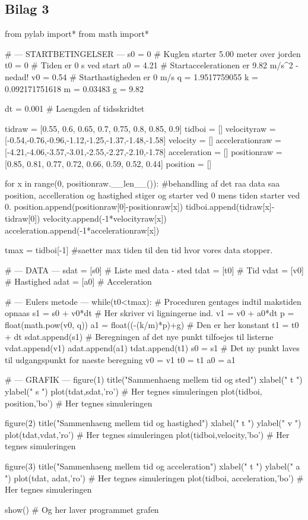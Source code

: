 \documentclass[12pt]{article}
\begin{document}
\subsection*{Bilag 3}
\begin{python}
  from pylab import*
  from math import*

  # --- STARTBETINGELSER ---
  s0 = 0         # Kuglen starter 5.00 meter over jorden
  t0 = 0         # Tiden er 0 s ved start
  a0 = 4.21      # Startaccelerationen er 9.82 m/s^2 - nedad!
  v0 = 0.54          # Starthastigheden er 0 m/s
  q = 1.9517759055
  k = 0.092171751618
  m = 0.03483
  g = 9.82

  dt = 0.001      # Laengden af tidsskridtet

  tidraw = [0.55, 0.6, 0.65, 0.7, 0.75, 0.8, 0.85, 0.9]
  tidboi = []
  velocityraw =[-0.54,-0.76,-0.96,-1.12,-1.25,-1.37,-1.48,-1.58]
  velocity = []
  accelerationraw = [-4.21,-4.06,-3.57,-3.01,-2.55,-2.27,-2.10,-1.78]
  acceleration = []
  positionraw = [0.85, 0.81, 0.77, 0.72, 0.66, 0.59, 0.52, 0.44]
  position = []

  for x in range(0, positionraw.__len__()):  #behandling af det raa data saa position, accelleration og hastighed stiger og starter ved 0 mens tiden starter ved 0.
      position.append(positionraw[0]-positionraw[x])
      tidboi.append(tidraw[x]-tidraw[0])
      velocity.append(-1*velocityraw[x])
      acceleration.append(-1*accelerationraw[x])

  tmax = tidboi[-1]   #saetter max tiden til den tid hvor vores data stopper.

  # --- DATA ---
  sdat = [s0]       # Liste med data - sted
  tdat = [t0]       # Tid
  vdat = [v0]       # Hastighed
  adat = [a0]     # Acceleration

  # --- Eulers metode ---
  while(t0<tmax):     # Proceduren gentages indtil makstiden opnaas
      s1 = s0 + v0*dt # Her skriver vi ligningerne ind.
      v1 = v0 + a0*dt
      p = float(math.pow(v0, q))
      a1 = float((-(k/m)*p)+g)       # Den er her konstant
      t1 = t0 + dt
      sdat.append(s1) # Beregningen af det nye punkt tilfoejes til listerne
      vdat.append(v1)
      adat.append(a1)
      tdat.append(t1)
      s0 = s1         # Det ny punkt laves til udgangspunkt for naeste beregning
      v0 = v1
      t0 = t1
      a0 = a1

  # --- GRAFIK ---
  figure(1)
  title("Sammenhaeng mellem tid og sted")
  xlabel(" t ")
  ylabel(" s ")
  plot(tdat,sdat,'ro')    # Her tegnes simuleringen
  plot(tidboi, position,'bo')    # Her tegnes simuleringen

  figure(2)
  title("Sammenhaeng mellem tid og hastighed")
  xlabel(" t ")
  ylabel(" v ")
  plot(tdat,vdat,'ro')    # Her tegnes simuleringen
  plot(tidboi,velocity,'bo')    # Her tegnes simuleringen

  figure(3)
  title("Sammenhaeng mellem tid og acceleration")
  xlabel(" t ")
  ylabel(" a ")
  plot(tdat, adat,'ro')    # Her tegnes simuleringen
  plot(tidboi, acceleration,'bo')    # Her tegnes simuleringen

  show()                  # Og her laver programmet grafen

\end{python}
\end{document}
